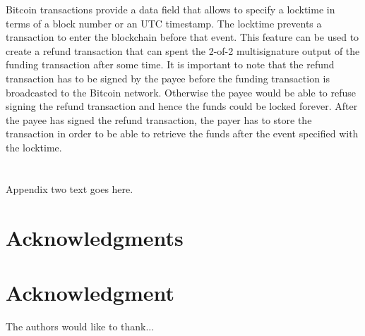 \documentclass[10pt,journal,compsoc]{IEEEtran}
\begin{document}
Bitcoin transactions provide a data field that allows to specify a locktime in terms of a block number or an UTC timestamp. The locktime prevents a transaction to enter the blockchain before that event. This feature can be used to create a refund transaction that can spent the 2-of-2 multisignature output of the funding transaction after some time. It is important to note that the refund transaction has to be signed by the payee before the funding transaction is broadcasted to the Bitcoin network. Otherwise the payee would be able to refuse signing the refund transaction and hence the funds could be locked forever. After the payee has signed the refund transaction, the payer has to store the transaction in order to be able to retrieve the funds after the event specified with the locktime.
\section{}
Appendix two text goes here.


\ifCLASSOPTIONcompsoc
  \section*{Acknowledgments}
\else
  \section*{Acknowledgment}
\fi


The authors would like to thank...


\ifCLASSOPTIONcaptionsoff
  \newpage
\fi







%
%
\end{document}
